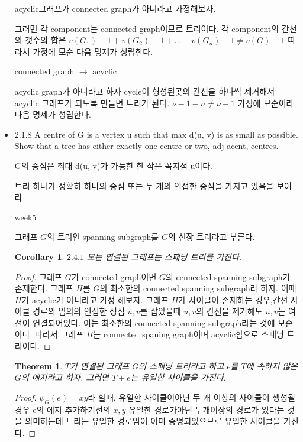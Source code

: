 \documentclass{oblivoir}
\newtheorem{theorem}{Theorem}[section]
\newtheorem{corollary}{Corollary}[theorem]
\begin{document}
\begin{itemize}
    acyclic그래프가 connected graph가 아니라고 가정해보자.

    그러면 각 component는 connected graph이므로 트리이다.
    각 component의 간선의 갯수의 합은 $v(G_1)-1 + v(G_2)-1 + ... + v(G_n)-1 \neq v(G)-1 $
    따라서 가정에 모순 다음 명제가 성립한다.

    connected graph $\rightarrow$ acyclic

    acyclic graph가 아니라고 하자 cycle이 형성된곳의 간선을 하나씩 제거해서 acyclic 그래프가 되도록 만들면 트리가 된다.
    $\nu-1-n \neq \nu -1 $ 가정에 모순이라 다음 명제가 성립한다.

    \item  2.1.8
    A centre of G is a vertex u such that max d(u, v) is as small as possible.
    Show that a tree has either exactly one centre or two,
    adj acent, centres.


    G의 중심은 최대 d(u, v)가 가능한 한 작은 꼭지점 u이다.

    트리 하나가 정확히 하나의 중심 또는 두 개의 인접한 중심을 가지고 있음을 보여라

    week5
  
    \begin{dfn}
        그래프 $G$의 트리인 spanning subgraph를 $G$의 신장 트리라고 부른다.
    \end{dfn}

    \begin{corollary}
        $2.4.1$ 모든 연결된 그래프는 스패닝 트리를 가진다.
    \end{corollary}

    \begin{proof}
        그래프 $G$가 connected graph이면 $G$의 cennected spanning subgraph가 존재한다.
        그래프 $H$를 $G$의 최소한의 connected spanning subgraph라 하자.
        이때 $H$가 acyclic가 아니라고 가정 해보자.
        그래프 $H$가 사이클이 존재하는 경우,간선 사이클 경로의 임의의 인접한 정점 $u, v$를 잡았을때 $u, v$의 간선을 제거해도 $u, v$는 여전이 연결되어있다. 이는 최소한의 connected spanning subgraph라는 것에 모순이다. 
        따라서 그래프 $H$는 connected spaning graph이며 acyclic함으로 스패닝 트리이다.
    \end{proof}

    \begin{theorem}
        $T$가 연결된 그래프 $G$의 스패닝 트리라고 하고 $e$를 $T$에 속하지 않은 $G$의 에지라고 하자. 그러면 $T + e$는 유일한 사이클을 가진다.
    \end{theorem}
    \begin{proof}
        $\psi_G(e) = xy$라 할때, 유일한 사이클이아닌 두 개 이상의 사이클이 생성될 경우  e의 에지 추가하기전의 $x, y$ 유일한 경로가아닌 두개이상의 경로가 있다는 것을 의미하는데 트리는 유일한 경로임이 이미 증명되었으므로 유일한 사이클을 가진다.
    \end{proof}


\end{itemize}
\end{document}
